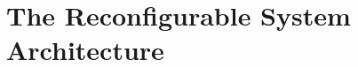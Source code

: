 \documentclass[a4paper,12pt]{book}
\begin{document}
\frontmatter



\mainmatter
\part{The Reconfigurable System Architecture}

\backmatter

\end{document}
